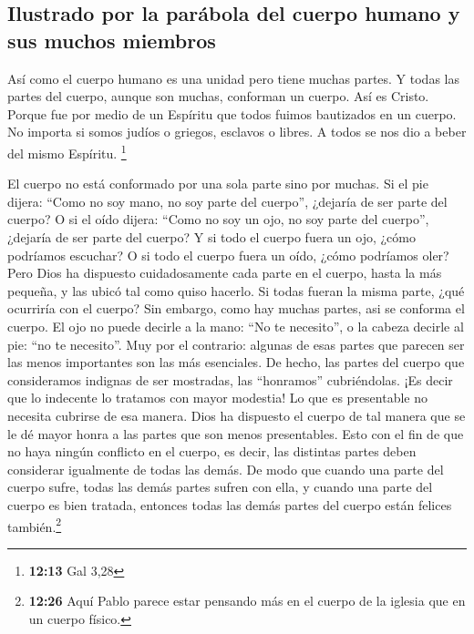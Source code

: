 \hypertarget{ilustrado-por-la-paruxe1bola-del-cuerpo-humano-y-sus-muchos-miembros}{%
\subsection{Ilustrado por la parábola del cuerpo humano y sus muchos
miembros}\label{ilustrado-por-la-paruxe1bola-del-cuerpo-humano-y-sus-muchos-miembros}}

 Así como el cuerpo humano es una unidad pero tiene
muchas partes. Y todas las partes del cuerpo, aunque son muchas,
conforman un cuerpo. Así es Cristo.  Porque fue por medio
de un Espíritu que todos fuimos bautizados en un cuerpo. No importa si
somos judíos o griegos, esclavos o libres. A todos se nos dio a beber
del mismo Espíritu. \footnote{\textbf{12:13} Gal 3,28}

 El cuerpo no está conformado por una sola parte sino por
muchas.  Si el pie dijera: ``Como no soy mano, no soy
parte del cuerpo'', ¿dejaría de ser parte del cuerpo?  O
si el oído dijera: ``Como no soy un ojo, no soy parte del cuerpo'',
¿dejaría de ser parte del cuerpo?  Y si todo el cuerpo
fuera un ojo, ¿cómo podríamos escuchar? O si todo el cuerpo fuera un
oído, ¿cómo podríamos oler?  Pero Dios ha dispuesto
cuidadosamente cada parte en el cuerpo, hasta la más pequeña, y las
ubicó tal como quiso hacerlo.  Si todas fueran la misma
parte, ¿qué ocurriría con el cuerpo?  Sin embargo, como
hay muchas partes, asi se conforma el cuerpo.  El ojo no
puede decirle a la mano: ``No te necesito'', o la cabeza decirle al pie:
``no te necesito''.  Muy por el contrario: algunas de
esas partes que parecen ser las menos importantes son las más
esenciales.  De hecho, las partes del cuerpo que
consideramos indignas de ser mostradas, las ``honramos'' cubriéndolas.
¡Es decir que lo indecente lo tratamos con mayor modestia!
 Lo que es presentable no necesita cubrirse de esa
manera. Dios ha dispuesto el cuerpo de tal manera que se le dé mayor
honra a las partes que son menos presentables.  Esto con
el fin de que no haya ningún conflicto en el cuerpo, es decir, las
distintas partes deben considerar igualmente de todas las demás.
 De modo que cuando una parte del cuerpo sufre, todas las
demás partes sufren con ella, y cuando una parte del cuerpo es bien
tratada, entonces todas las demás partes del cuerpo están felices
también.\footnote{\textbf{12:26} Aquí Pablo parece estar pensando más en
  el cuerpo de la iglesia que en un cuerpo físico.}

